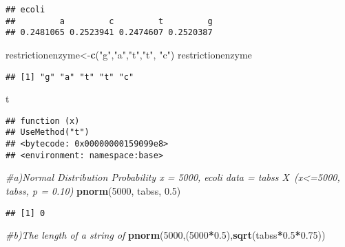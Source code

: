 \documentclass[
]{article}
\newenvironment{Shaded}{\begin{snugshade}}{\end{snugshade}}
\newcommand{\CommentTok}[1]{\textcolor[rgb]{0.56,0.35,0.01}{\textit{#1}}}
\newcommand{\DecValTok}[1]{\textcolor[rgb]{0.00,0.00,0.81}{#1}}
\newcommand{\FloatTok}[1]{\textcolor[rgb]{0.00,0.00,0.81}{#1}}
\newcommand{\KeywordTok}[1]{\textcolor[rgb]{0.13,0.29,0.53}{\textbf{#1}}}
\newcommand{\NormalTok}[1]{#1}
\newcommand{\OperatorTok}[1]{\textcolor[rgb]{0.81,0.36,0.00}{\textbf{#1}}}
\newcommand{\StringTok}[1]{\textcolor[rgb]{0.31,0.60,0.02}{#1}}
\begin{document}
\begin{verbatim}
## ecoli
##         a         c         t         g 
## 0.2481065 0.2523941 0.2474607 0.2520387
\end{verbatim}

\begin{Shaded}
\begin{Highlighting}[]
\NormalTok{restrictionenzyme<-}\KeywordTok{c}\NormalTok{(}\StringTok{"g"}\NormalTok{,}\StringTok{"a"}\NormalTok{,}\StringTok{"t"}\NormalTok{,}\StringTok{"t"}\NormalTok{, }\StringTok{"c"}\NormalTok{)}
\NormalTok{restrictionenzyme}
\end{Highlighting}
\end{Shaded}

\begin{verbatim}
## [1] "g" "a" "t" "t" "c"
\end{verbatim}

\begin{Shaded}
\begin{Highlighting}[]
\NormalTok{t}
\end{Highlighting}
\end{Shaded}

\begin{verbatim}
## function (x) 
## UseMethod("t")
## <bytecode: 0x00000000159099e8>
## <environment: namespace:base>
\end{verbatim}

\begin{Shaded}
\begin{Highlighting}[]
\CommentTok{#a)Normal Distribution Probability x = 5000, ecoli data = tabss X~(x<=5000, tabss, p = 0.10)}
 \KeywordTok{pnorm}\NormalTok{(}\DecValTok{5000}\NormalTok{, tabss, }\FloatTok{0.5}\NormalTok{)}
\end{Highlighting}
\end{Shaded}

\begin{verbatim}
## [1] 0
\end{verbatim}

\begin{Shaded}
\begin{Highlighting}[]
\CommentTok{#b)The length of a string of }
 \KeywordTok{pnorm}\NormalTok{(}\DecValTok{5000}\NormalTok{,(}\DecValTok{5000}\OperatorTok{*}\FloatTok{0.5}\NormalTok{),}\KeywordTok{sqrt}\NormalTok{(tabss}\OperatorTok{*}\FloatTok{0.5}\OperatorTok{*}\FloatTok{0.75}\NormalTok{))}
\end{Highlighting}
\end{Shaded}
\end{document}
